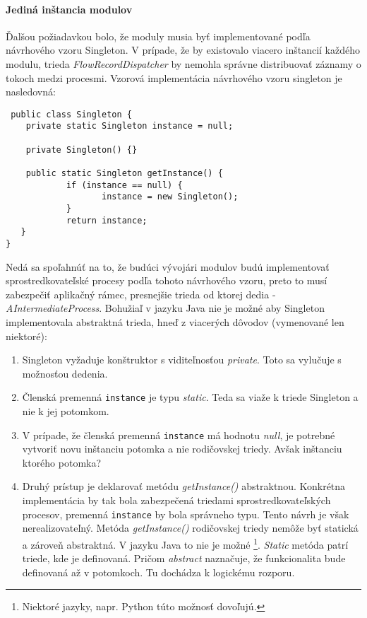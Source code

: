 \paragraph{Jediná inštancia modulov} \label{sec:singleton}
Ďalšou požiadavkou bolo, že moduly musia byť implementované podľa návrhového vzoru Singleton. V prípade, že
by existovalo viacero inštancií každého modulu, trieda \emph{FlowRecordDispatcher} by nemohla správne 
distribuovať záznamy o tokoch medzi procesmi. Vzorová implementácia návrhového
vzoru singleton je nasledovná:  
\begin{verbatim}
 public class Singleton {
    private static Singleton instance = null;
 
    private Singleton() {}
 
    public static Singleton getInstance() {
            if (instance == null) {
                   instance = new Singleton();
            }
            return instance;
   }
}
\end{verbatim}
Nedá sa spoľahnúť na to, že budúci vývojári modulov budú implementovať sprostredkovateľské procesy 
podľa tohoto návrhového vzoru, preto to musí zabezpečiť aplikačný rámec, presnejšie trieda od ktorej 
dedia - \emph{AIntermediateProcess}.
Bohužiaľ v jazyku Java nie je možné aby Singleton implementovala abstraktná trieda, hneď z viacerých
dôvodov (vymenované len niektoré):
\begin{enumerate}
 \item Singleton vyžaduje konštruktor s viditeľnosťou \emph{private}. Toto sa vylučuje s možnosťou 
 dedenia.
 \item Členská premenná \verb|instance| je typu \emph{static}. Teda sa viaže k triede Singleton a nie k jej 
 potomkom.
 \item V prípade, že členská premenná \verb|instance| má hodnotu \emph{null}, je potrebné vytvoriť novu inštanciu 
 potomka a nie rodičovskej triedy. Avšak inštanciu ktorého potomka?
 \item Druhý prístup je deklarovať metódu \emph{getInstance()} abstraktnou. Konkrétna implementácia 
 by tak bola zabezpečená triedami sprostredkovateľských procesov, premenná \verb|instance|
 by bola správneho typu. Tento návrh je však nerealizovateľný. 
 Metóda \emph{getInstance()} rodičovskej triedy nemôže byť statická a zároveň abstraktná. V jazyku Java
 to nie je možné \footnote{Niektoré jazyky, napr. Python túto možnosť dovoľujú.}. 
 \emph{Static} metóda patrí triede, kde je definovaná. 
 Pričom \emph{abstract} naznačuje, že funkcionalita bude definovaná až v potomkoch. Tu dochádza k 
 logickému rozporu.
\end{enumerate}
